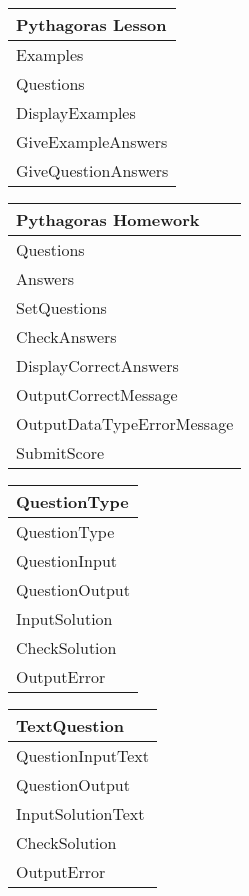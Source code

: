 \begin{center}
\begin{tabular}{|p{5cm}|} \hline
Pythagoras Lesson \\ \hline
Examples \\
Questions \\ \hline
DisplayExamples \\
GiveExampleAnswers \\
GiveQuestionAnswers \\ \hline
\end{tabular}
\end{center}

\begin{center}
\begin{tabular}{|p{5cm}|} \hline
Pythagoras Homework \\ \hline
Questions \\
Answers \\ \hline
SetQuestions \\
CheckAnswers \\
DisplayCorrectAnswers \\
OutputCorrectMessage \\
OutputDataTypeErrorMessage \\
SubmitScore \\ \hline
\end{tabular}
\end{center}

\begin{center}
\begin{tabular}{|p{5cm}|} \hline
QuestionType \\ \hline
QuestionType \\
QuestionInput \\
QuestionOutput \\ \hline
InputSolution \\
CheckSolution \\
OutputError \\ \hline
\end{tabular}
\end{center}

\begin{center}
\begin{tabular}{|p{5cm}|} \hline
TextQuestion \\ \hline
QuestionInputText \\ 
QuestionOutput \\ \hline
InputSolutionText \\ 
CheckSolution \\
OutputError \\ \hline
\end{tabular}
\end{center}


